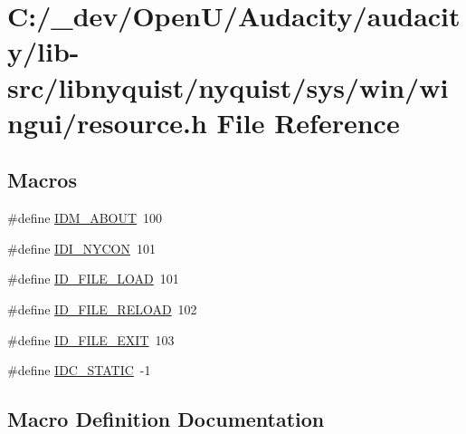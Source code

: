 \hypertarget{lib-src_2libnyquist_2nyquist_2sys_2win_2wingui_2resource_8h}{}\section{C\+:/\+\_\+dev/\+Open\+U/\+Audacity/audacity/lib-\/src/libnyquist/nyquist/sys/win/wingui/resource.h File Reference}
\label{lib-src_2libnyquist_2nyquist_2sys_2win_2wingui_2resource_8h}
\subsection*{Macros}
\begin{DoxyCompactItemize}
\item 
\#define \hyperlink{lib-src_2libnyquist_2nyquist_2sys_2win_2wingui_2resource_8h_a589e0105bc3e8681893dbf51210ceeec}{I\+D\+M\+\_\+\+A\+B\+O\+UT}~100
\item 
\#define \hyperlink{lib-src_2libnyquist_2nyquist_2sys_2win_2wingui_2resource_8h_a419f36545d8bfc3afbe37da7c4884c67}{I\+D\+I\+\_\+\+N\+Y\+C\+ON}~101
\item 
\#define \hyperlink{lib-src_2libnyquist_2nyquist_2sys_2win_2wingui_2resource_8h_a81307e5d946e6a8bccf494a1a5dd7c8e}{I\+D\+\_\+\+F\+I\+L\+E\+\_\+\+L\+O\+AD}~101
\item 
\#define \hyperlink{lib-src_2libnyquist_2nyquist_2sys_2win_2wingui_2resource_8h_a94122e9dd101aa8c9b1f8342379a6e81}{I\+D\+\_\+\+F\+I\+L\+E\+\_\+\+R\+E\+L\+O\+AD}~102
\item 
\#define \hyperlink{lib-src_2libnyquist_2nyquist_2sys_2win_2wingui_2resource_8h_a3a6cb842433474b721f52d5f3d23ebd4}{I\+D\+\_\+\+F\+I\+L\+E\+\_\+\+E\+X\+IT}~103
\item 
\#define \hyperlink{lib-src_2libnyquist_2nyquist_2sys_2win_2wingui_2resource_8h_ac93033490bc8943cfc82ec3b40e5cd74}{I\+D\+C\+\_\+\+S\+T\+A\+T\+IC}~-\/1
\end{DoxyCompactItemize}


\subsection{Macro Definition Documentation}
